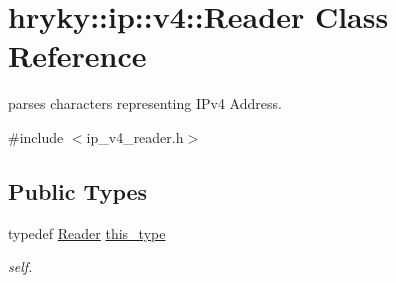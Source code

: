 \hypertarget{classhryky_1_1ip_1_1v4_1_1_reader}{\section{hryky\-:\-:ip\-:\-:v4\-:\-:Reader Class Reference}
\label{classhryky_1_1ip_1_1v4_1_1_reader}
}


parses characters representing I\-Pv4 Address.  




{\ttfamily \#include $<$ip\-\_\-v4\-\_\-reader.\-h$>$}

\subsection*{Public Types}
\begin{DoxyCompactItemize}
\item 
\hypertarget{classhryky_1_1ip_1_1v4_1_1_reader_a007590474d740ed246e201fe227b618f}{typedef \hyperlink{classhryky_1_1ip_1_1v4_1_1_reader}{Reader} \hyperlink{classhryky_1_1ip_1_1v4_1_1_reader_a007590474d740ed246e201fe227b618f}{this\-\_\-type}}\label{classhryky_1_1ip_1_1v4_1_1_reader_a007590474d740ed246e201fe227b618f}

\begin{DoxyCompactList}\small\item\em self. \end{DoxyCompactList}\end{DoxyCompactItemize}
